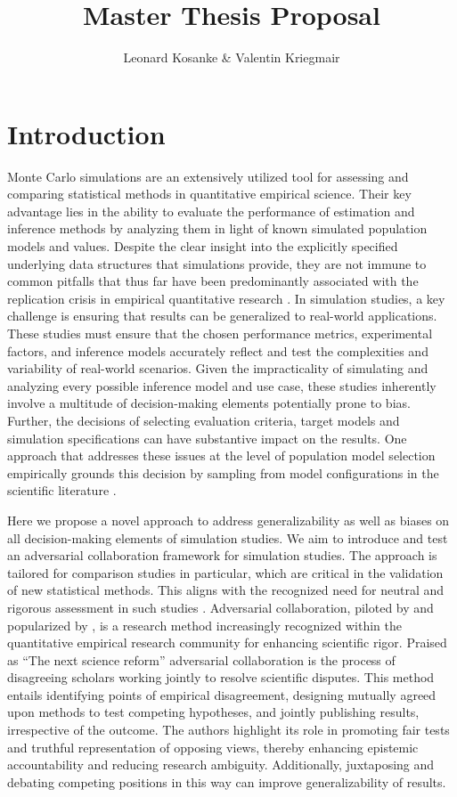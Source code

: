 \documentclass[man]{apa7}
\title{Master Thesis Proposal}
\author{Leonard Kosanke & Valentin Kriegmair}
\affiliation{Humboldt University Berlin}
\begin{document}
\maketitle

\section{Introduction}
Monte Carlo simulations are an extensively utilized tool for assessing and comparing statistical methods in quantitative empirical science. Their key advantage lies in the ability to evaluate the performance of estimation and inference methods by analyzing them in light of known simulated population models and values. Despite the clear insight into the explicitly specified underlying data structures that simulations provide, they are not immune to common pitfalls that thus far have been predominantly associated with the replication crisis in empirical quantitative research \parencite{lohmann_its_2022}. In simulation studies, a key challenge is ensuring that results can be generalized to real-world applications. These studies must ensure that the chosen performance metrics, experimental factors, and inference models accurately reflect and test the complexities and variability of real-world scenarios. Given the impracticality of simulating and analyzing every possible inference model and use case, these studies inherently involve a multitude of decision-making elements potentially prone to bias. Further, the decisions of selecting evaluation criteria, target models and simulation specifications can have substantive impact on the results. One approach that addresses these issues at the level of population model selection empirically grounds this decision by sampling from model configurations in the scientific literature \parencite{bollmann_what_2015}.

Here we propose a novel approach to address generalizability as well as biases on all decision-making elements of simulation studies. We aim to introduce and test an adversarial collaboration framework for simulation studies. The approach is tailored for comparison studies in particular, which are critical in the validation of new statistical methods. This aligns with the recognized need for neutral and rigorous assessment in such studies \parencite{boulesteix_plea_2013}. Adversarial collaboration, piloted by \parencite{mellers_frequency_2001} and popularized by \parencite{kahneman_thinking_2011}, is a research method increasingly recognized within the quantitative empirical research community for enhancing scientific rigor. Praised as “The next science reform” \parencite{clark_adversarial_2021} adversarial collaboration is the process of disagreeing scholars working jointly to resolve scientific disputes. This method entails identifying points of empirical disagreement, designing mutually agreed upon methods to test competing hypotheses, and jointly publishing results, irrespective of the outcome. The authors highlight its role in promoting fair tests and truthful representation of opposing views, thereby enhancing epistemic accountability and reducing research ambiguity. Additionally, juxtaposing and debating competing positions in this way can improve generalizability of results.
\end{document}
